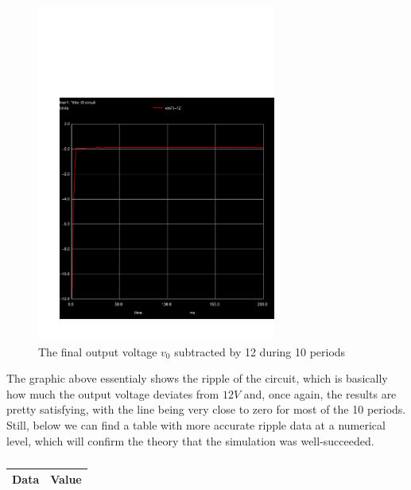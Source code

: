 \begin{figure}[H]\centering
\includegraphics[trim= 0cm 0cm 0cm 10cm, clip, width=0.7\textwidth]{trans3.pdf}
\caption{The final output voltage $v_0$ subtracted by 12 during 10 periods}
\label{fig:sim_outputdiff}
\end{figure}

The graphic above essentialy shows the ripple of the circuit, which is basically how much the output voltage deviates from $12V$ and, once again, the results are pretty satisfying, with the line being very close to zero for most of the 10 periods. Still, below we can find a table with more accurate ripple data at a numerical level, which will confirm the theory that the simulation was well-succeeded.



\begin{table}[H] \centering
  \begin{tabular}{|l|r|}
    \hline    
    {\bf Data} & {\bf Value} \\ \hline
    
  \end{tabular}
  \caption{}
 \label{tab:op}
\end{table}
